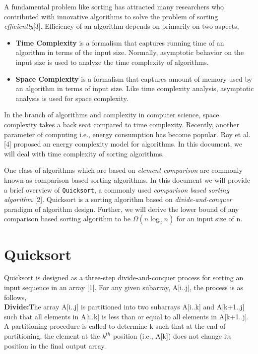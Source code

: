 \documentclass[a4paper, 10pt,twocolumn]{article}
\begin{document}
A fundamental problem like sorting has attracted many researchers who contributed with innovative algorithms to solve the problem of sorting \textit{efficiently}[3]. Efficiency of an algorithm depends on primarily on two aspects,
\begin{itemize}
    \item \textbf{Time Complexity} is a formalism that captures running time of an algorithm in terms of the input size. Normally, asymptotic behavior on the input size is used to analyze the time complexity of algorithms.
    \vspace{-2mm}
    \item \textbf{Space Complexity} is a formalism that captures amount of memory used by an algorithm in terms of input size. Like time complexity analysis, asymptotic analysis is used for space complexity.
\end{itemize}
\vspace{-2mm}
In the branch of algorithms and complexity in computer science, space complexity takes a back seat compared to time complexity. Recently, another parameter of computing i.e., energy consumption
has become popular. Roy et al. [4] proposed an energy complexity model for algorithms. In this document, we will deal with time complexity of sorting algorithms.

One class of algorithms which are based on \textit{element comparison} are commonly known as comparison based sorting algorithms. In this document we will provide a brief overview of \texttt{Quicksort}, a commonly used \textit{comparison based sorting algorithm} [2]. Quicksort is a sorting algorithm based on \textit{divide-and-conquer} paradigm of algorithm design. Further, we will derive the lower bound of any comparison based sorting algorithm to be $\Omega(n\log_2 n)$ for an input size of n.
\section{Quicksort}
Quicksort is designed as a three-step divide-and-conquer process for sorting an input sequence in an array [1]. For any given subarray, A[i..j], the process is as follows,\\
\textbf{Divide:}The array A[i..j] is partitioned into two subarrays
A[i..k] and A[k+1..j] such that all elements in A[i..k] is less than or equal to all elements in A[k+1..j]. A partitioning procedure is called to determine k such that at the end of partitioning, the element at the $k^{th}$ position (i.e., A[k]) does not change its position in the final output array.\\
\end{document}

